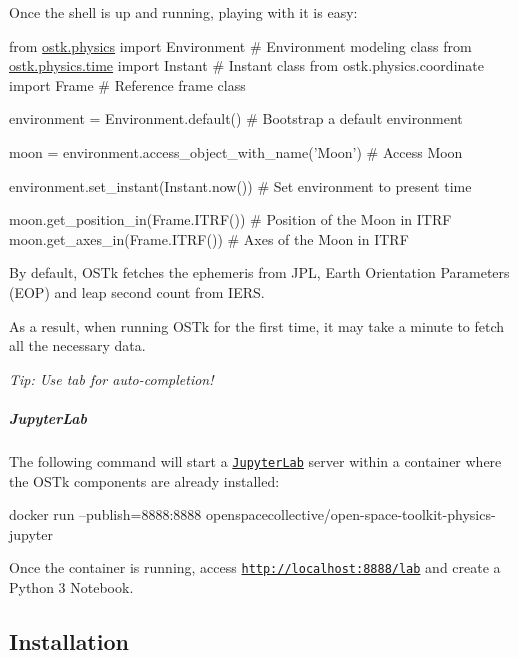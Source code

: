Once the shell is up and running, playing with it is easy\+:


\begin{DoxyCode}
\textcolor{keyword}{from} \hyperlink{namespaceostk_1_1physics}{ostk.physics} \textcolor{keyword}{import} Environment \textcolor{comment}{# Environment modeling class}
\textcolor{keyword}{from} \hyperlink{namespaceostk_1_1physics_1_1time}{ostk.physics.time} \textcolor{keyword}{import} Instant \textcolor{comment}{# Instant class}
\textcolor{keyword}{from} ostk.physics.coordinate \textcolor{keyword}{import} Frame \textcolor{comment}{# Reference frame class}

environment = Environment.default() \textcolor{comment}{# Bootstrap a default environment}

moon = environment.access\_object\_with\_name(\textcolor{stringliteral}{'Moon'}) \textcolor{comment}{# Access Moon}

environment.set\_instant(Instant.now()) \textcolor{comment}{# Set environment to present time}

moon.get\_position\_in(Frame.ITRF()) \textcolor{comment}{# Position of the Moon in ITRF}
moon.get\_axes\_in(Frame.ITRF()) \textcolor{comment}{# Axes of the Moon in ITRF}
\end{DoxyCode}


By default, O\+S\+Tk fetches the ephemeris from J\+PL, Earth Orientation Parameters (E\+OP) and leap second count from I\+E\+RS.

As a result, when running O\+S\+Tk for the first time, it may take a minute to fetch all the necessary data.

{\itshape Tip\+: Use tab for auto-\/completion!}

\subparagraph*{Jupyter\+Lab}

The following command will start a \href{https://jupyterlab.readthedocs.io/en/stable/}{\tt Jupyter\+Lab} server within a container where the O\+S\+Tk components are already installed\+:


\begin{DoxyCode}
docker run --publish=8888:8888 openspacecollective/open-space-toolkit-physics-jupyter
\end{DoxyCode}


Once the container is running, access \href{http://localhost:8888/lab}{\tt http\+://localhost\+:8888/lab} and create a Python 3 Notebook.

\subsection*{Installation}

